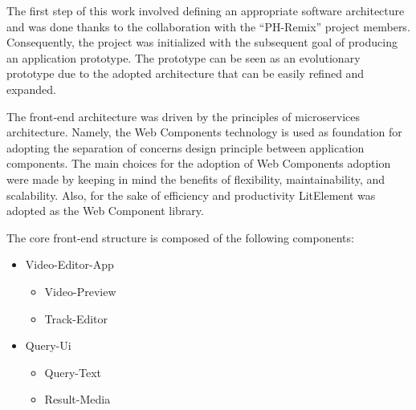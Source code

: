 The first step of this work involved defining an appropriate software architecture and was done thanks to the collaboration with the “PH-Remix” project members. Consequently, the project was initialized with the subsequent goal of producing an application prototype. The prototype can be seen as an evolutionary prototype due to the adopted architecture that can be easily refined and expanded.

The front-end architecture was driven by the principles of microservices architecture. Namely, the Web Components technology is used as foundation for adopting the separation of concerns design principle between application components. The main choices for the adoption of Web Components adoption were made by keeping in mind the benefits of flexibility, maintainability, and scalability. Also, for the sake of efficiency and productivity LitElement was adopted as the Web Component library.

The core front-end structure is composed of the following components: 

\begin{itemize}
\item Video-Editor-App
    \begin{itemize}
        \item Video-Preview
        \item Track-Editor
    \end{itemize}
\item Query-Ui
    \begin{itemize}
        \item Query-Text
        \item Result-Media
    \end{itemize}
\end{itemize}

